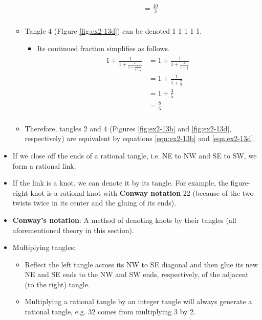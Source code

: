 \documentclass[titlepage]{article}
\numberwithin{figure}{section}
\numberwithin{table}{section}
\numberwithin{equation}{section}
\begin{document}
\begin{itemize}
\begin{itemize}
\begin{itemize}
\begin{align}
\begin{split}
                    &= \frac{10}{3}\\
                \end{split}
            \end{align}
        \end{itemize}
        \item Tangle 4 (Figure \ref{fig:ex2-13d}) can be denoted 1 1 1 1 1.
        \begin{itemize}
            \item Its continued fraction simplifies as follows.
            \begin{align}
                \begin{split}\label{eqn:ex2-13d}
                    1+\frac{1}{1+\frac{1}{1+\frac{1}{1+\frac{1}{1}}}} &= 1+\frac{1}{1+\frac{1}{1+\frac{1}{2}}}\\
                    &= 1+\frac{1}{1+\frac{2}{3}}\\
                    &= 1+\frac{3}{5}\\
                    &= \frac{8}{5}\\
                \end{split}
            \end{align}
        \end{itemize}
        \item Therefore, tangles 2 and 4 (Figures \ref{fig:ex2-13b} and \ref{fig:ex2-13d}, respectively) are equivalent by equations \ref{eqn:ex2-13b} and \ref{eqn:ex2-13d}.
    \end{itemize}
    \item If we close off the ends of a rational tangle, i.e. NE to NW and SE to SW, we form a rational link.
    \item If the link is a knot, we can denote it by its tangle. For example, the figure-eight knot is a rational knot with \textbf{Conway notation} 22 (because of the two twists twice in its center and the gluing of its ends).
    \item \textbf{Conway's notation}: A method of denoting knots by their tangles (all aforementioned theory in this section).
    \item Multiplying tangles:
    \begin{itemize}
        \item Reflect the left tangle across its NW to SE diagonal and then glue its new NE and SE ends to the NW and SW ends, respectively, of the adjacent (to the right) tangle.
        \item Multiplying a rational tangle by an integer tangle will always generate a rational tangle, e.g. 32 comes from multiplying 3 by 2.

\end{itemize}
\end{itemize}
\end{document}

